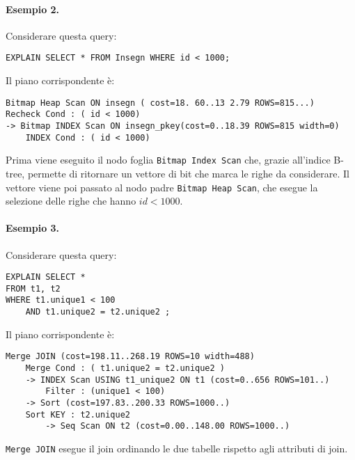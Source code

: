 \documentclass[a4paper, 10pt, titlepage]{article}
\begin{document}
	\paragraph{Esempio 2.} 
	Considerare questa query:
	\begin{lstlisting}
EXPLAIN SELECT * FROM Insegn WHERE id < 1000;
	\end{lstlisting}
	Il piano corrispondente è:
	\begin{lstlisting}
Bitmap Heap Scan ON insegn ( cost=18. 60..13 2.79 ROWS=815...)
Recheck Cond : ( id < 1000)
-> Bitmap INDEX Scan ON insegn_pkey(cost=0..18.39 ROWS=815 width=0)
	INDEX Cond : ( id < 1000)
	\end{lstlisting}
	Prima viene eseguito il nodo foglia \lstinline|Bitmap Index Scan| che, grazie all'indice B-tree, permette di ritornare un vettore di bit che marca le righe da considerare. Il vettore viene poi passato al nodo padre \lstinline|Bitmap Heap Scan|, che esegue la selezione delle righe che hanno $id < 1000$. \medskip
	
	\paragraph{Esempio 3.}
		Considerare questa query:
	\begin{lstlisting}
EXPLAIN SELECT *
FROM t1, t2
WHERE t1.unique1 < 100 
	AND t1.unique2 = t2.unique2 ;
	\end{lstlisting}
	Il piano corrispondente è:
	\begin{lstlisting}
Merge JOIN (cost=198.11..268.19 ROWS=10 width=488)
	Merge Cond : ( t1.unique2 = t2.unique2 )
	-> INDEX Scan USING t1_unique2 ON t1 (cost=0..656 ROWS=101..)
		Filter : (unique1 < 100)
	-> Sort (cost=197.83..200.33 ROWS=1000..)
	Sort KEY : t2.unique2
		-> Seq Scan ON t2 (cost=0.00..148.00 ROWS=1000..)
	\end{lstlisting}
\lstinline|Merge JOIN| esegue il join ordinando le due tabelle rispetto agli attributi di join. \medskip
\end{document}
